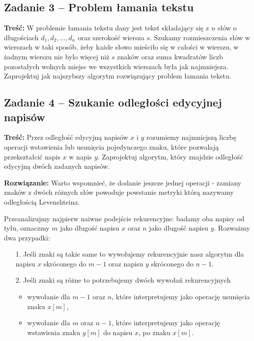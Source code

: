 \subsection{Zadanie 3 -- Problem łamania tekstu}
\textbf{Treść:} W problemie łamania tekstu dany jest tekst składający się z $n$
słów o długościach $d_1, d_2, \ldots , d_n$ oraz
szerokość wiersza $s$. Szukamy rozmieszczenia słów w wierszach w taki 
sposób, żeby każde słowo mieściło się w całości
w wierszu, w żadnym wierszu nie bylo więcej niż $s$ znaków 
oraz suma kwadratów liczb pozostałych wolnych miejsc we
wszystkich wierszach była jak najmniejsza.
Zaprojektuj jak najszybszy algorytm rozwiązujący problem łamania tekstu.
\subsection{Zadanie 4 -- Szukanie odległości edycyjnej napisów}
\textbf{Treść:} Przez odległość edycyjną napisów 
$x$ i $y$ rozumiemy najmniejszą liczbę operacji wstawienia lub usunięcia
pojedynczego znaku, które pozwalają przekształcić napis $x$ w napis $y$.
Zaprojektuj algorytm, który znajdzie odległość 
edycyjną dwóch zadanych napisów.


\textbf{Rozwiązanie:}
Warto wspomnieć, że dodanie jeszcze jednej operacji - 
zamiany znaków z dwóch różnych słów powoduje powstanie metryki
którą nazywamy odległością Levenshteina.

Przeanalizujmy najpierw naiwne podejście rekurencyjne: badamy 
oba napisy od tyłu, oznaczmy $m$ jako długość napisu $x$
oraz $n$ jako długość napisu $y$. Rozważmy dwa przypadki: 

\begin{itemize}
	\item[1.] Jeśli znaki są takie same to wywołujemy rekurencyjnie
	nasz algorytm dla napisu $x$ skróconego do $m - 1$ oraz 
	napisu $y$ skróconego do $n - 1$.
	\item[2.] Jeśli znaki są różne to potrzebujemy dwóch wywołań rekurencyjnych
	\begin{itemize}
		\item wywołanie dla $m - 1$ oraz $n$, które interpretujemy jako operację usunięcia znaku $x[m]$,
		\item wywołanie dla $m$ oraz $n - 1$, które
		interpretujemy jako operację wstawienia znaku $y[m]$ do napisu $x$,
		po znaku $x[m]$.
	\end{itemize} 
\end{itemize}

